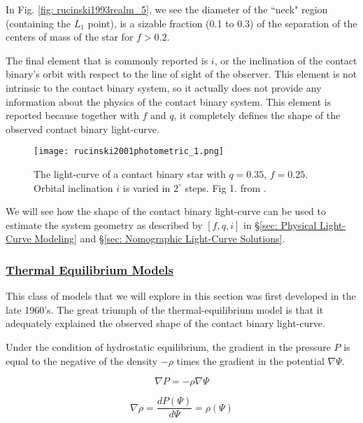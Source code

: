 \documentclass[12pt]{article} %
\numberwithin{equation}{section} %
\begin{document}
In Fig. \ref{fig: rucinski1993realm_5}, we see the diameter of the ``neck" region (containing the $L_{1}$ point), is a sizable fraction (0.1 to 0.3) of the separation of the centers of mass of the star for $f > 0.2$.

The final element that is commonly reported is $i$, or the inclination of the contact binary's orbit with respect to the line of sight of the observer. This element is not intrinsic to the contact binary system, so it actually does not provide any information about the physics of the contact binary system. This element is reported because together with $f$ and $q$, it completely defines the shape of the observed contact binary light-curve.

\begin{figure}[H]
\centering
\texttt{[image: rucinski2001photometric\_1.png]}
\caption{The light-curve of a contact binary star with $q = 0.35$, $f = 0.25$. Orbital inclination $i$ is varied in $2^{\circ}$ steps. Fig 1. from \citet{rucinski2001photometric}.}
\label{fig: rucinski2001photometric_1}
\end{figure}

We will see how the shape of the contact binary light-curve can be used to estimate the system geometry as described by $[f,q,i]$ in \S\ref{sec: Physical Light-Curve Modeling} and \S\ref{sec: Nomographic Light-Curve Solutions}.

\subsubsection[Thermal Equilibrium Models]{\hyperlink{toc}{Thermal Equilibrium Models}} \label{sec: Thermal Equilibrium Models}

This class of models that we will explore in this section was first developed in the late 1960's. The great triumph of the thermal-equilibrium model is that it adequately explained the observed shape of the contact binary light-curve. 

Under the condition of hydrostatic equilibrium, the gradient in the pressure $P$ is equal to the negative of the density $- \rho$ times the gradient in the potential $\nabla \Psi$. 

\begin{equation} \label{eqn: equilibrium1}
\nabla P = - \rho \nabla \Psi
\end{equation}

\begin{equation} \label{eqn: equilibrium2}
\nabla \rho = \frac{dP(\Psi)}{d\Psi} = \rho(\Psi)
\end{equation}
\end{document}
